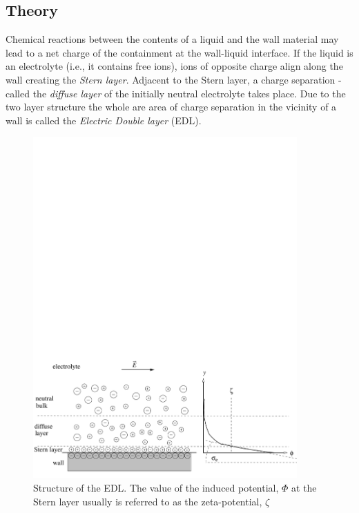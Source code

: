 \begin{versiona}
\section{Theory}
Chemical reactions between the contents of a liquid and the wall material may lead to a net charge of the containment at the wall-liquid interface. If the liquid is an electrolyte (i.e., it contains free ions), ions of opposite charge align along the wall creating the \textit{Stern layer}. Adjacent to the Stern layer, a charge separation - called the \textit{diffuse layer} of the initially neutral electrolyte takes place. Due to the two layer structure the whole are area of charge separation in the vicinity of a wall is called the \textit{Electric Double layer} (EDL). 
\begin{figure}[tbhp]
\centerline{\includegraphics[width=0.9\textwidth]{EDL_bw.pdf}}
\caption{\label{ek:Fig.EDL} Structure of the EDL. The value of the induced potential, $\Phi$ at the Stern layer usually is referred to as the zeta-potential, $\zeta$}
\end{figure}

\end{versiona}
